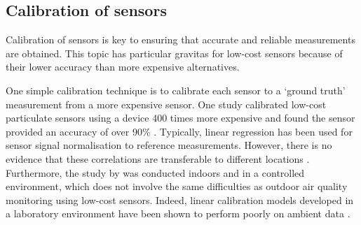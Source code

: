 \documentclass[11pt,twosided,a4paper]{report}
\begin{document}
\subsection{Calibration of sensors}

Calibration of sensors is key to ensuring that accurate and reliable measurements are obtained. This topic has particular gravitas for low-cost sensors because of their lower accuracy than more expensive alternatives.

%
%

One simple calibration technique is to calibrate each sensor to a `ground truth' measurement from a more expensive sensor. One study calibrated low-cost particulate sensors using a device 400 times more expensive and found the sensor provided an accuracy of over 90\% \citep{thorpe2017RPimesh}. Typically, linear regression has been used for sensor signal normalisation to reference measurements. However, there is no evidence that these correlations are transferable to different locations \citep{Clements2017lowcostworkshop}. Furthermore, the study by \cite{thorpe2017RPimesh} was conducted indoors and in a controlled environment, which does not involve the same difficulties as outdoor air quality monitoring using low-cost sensors. Indeed, linear calibration models developed in a laboratory environment have been shown to perform poorly on ambient data \citep{Castell2017}.
\end{document}
